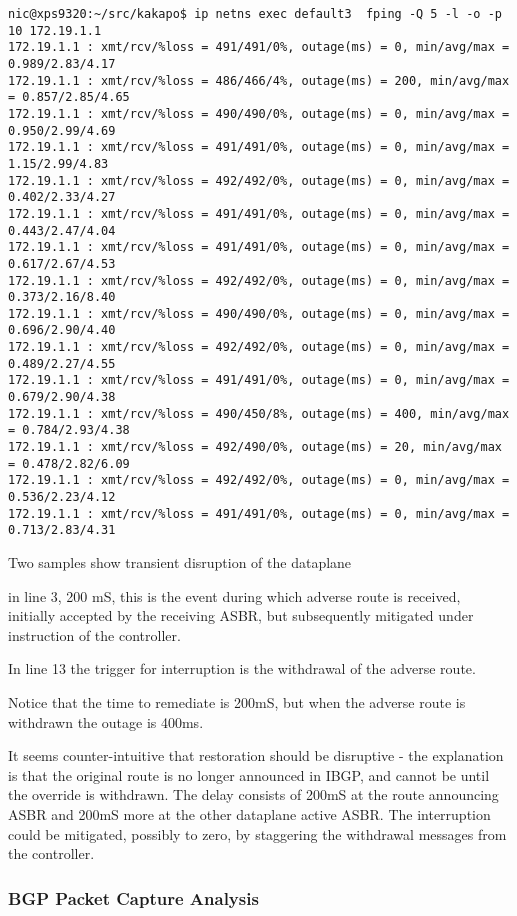 \begin{lstlisting}[title=fping reported outages at 5 second intervals]
nic@xps9320:~/src/kakapo$ ip netns exec default3  fping -Q 5 -l -o -p 10 172.19.1.1
172.19.1.1 : xmt/rcv/%loss = 491/491/0%, outage(ms) = 0, min/avg/max = 0.989/2.83/4.17
172.19.1.1 : xmt/rcv/%loss = 486/466/4%, outage(ms) = 200, min/avg/max = 0.857/2.85/4.65
172.19.1.1 : xmt/rcv/%loss = 490/490/0%, outage(ms) = 0, min/avg/max = 0.950/2.99/4.69
172.19.1.1 : xmt/rcv/%loss = 491/491/0%, outage(ms) = 0, min/avg/max = 1.15/2.99/4.83
172.19.1.1 : xmt/rcv/%loss = 492/492/0%, outage(ms) = 0, min/avg/max = 0.402/2.33/4.27
172.19.1.1 : xmt/rcv/%loss = 491/491/0%, outage(ms) = 0, min/avg/max = 0.443/2.47/4.04
172.19.1.1 : xmt/rcv/%loss = 491/491/0%, outage(ms) = 0, min/avg/max = 0.617/2.67/4.53
172.19.1.1 : xmt/rcv/%loss = 492/492/0%, outage(ms) = 0, min/avg/max = 0.373/2.16/8.40
172.19.1.1 : xmt/rcv/%loss = 490/490/0%, outage(ms) = 0, min/avg/max = 0.696/2.90/4.40
172.19.1.1 : xmt/rcv/%loss = 492/492/0%, outage(ms) = 0, min/avg/max = 0.489/2.27/4.55
172.19.1.1 : xmt/rcv/%loss = 491/491/0%, outage(ms) = 0, min/avg/max = 0.679/2.90/4.38
172.19.1.1 : xmt/rcv/%loss = 490/450/8%, outage(ms) = 400, min/avg/max = 0.784/2.93/4.38
172.19.1.1 : xmt/rcv/%loss = 492/490/0%, outage(ms) = 20, min/avg/max = 0.478/2.82/6.09
172.19.1.1 : xmt/rcv/%loss = 492/492/0%, outage(ms) = 0, min/avg/max = 0.536/2.23/4.12
172.19.1.1 : xmt/rcv/%loss = 491/491/0%, outage(ms) = 0, min/avg/max = 0.713/2.83/4.31
\end{lstlisting}

Two samples show transient disruption of the dataplane

in line 3, 200 mS, this is the event during which adverse route is received, initially accepted by the receiving ASBR, but subsequently mitigated under instruction of the controller.

In line 13 the trigger for interruption is the withdrawal of the adverse route.

Notice that the time to remediate is 200mS, but when the adverse route is withdrawn the outage is 400ms.

It seems counter-intuitive that restoration should be disruptive - the explanation is that the original route is no longer announced in IBGP, and cannot be until the override is withdrawn.
The delay consists of 200mS at the route announcing ASBR and 200mS more at the other dataplane active ASBR.
The interruption could be mitigated, possibly to zero, by staggering the withdrawal messages from the controller.


\subsubsection{BGP Packet Capture Analysis}
